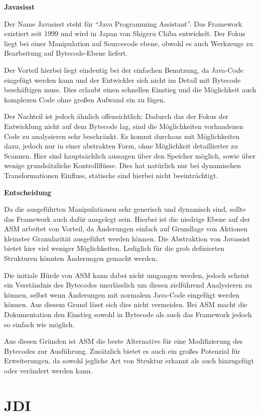\textbf{Javasisst}

Der Name Javasisst steht für "`Java Programming Assistant"'. Das Framework existiert seit 1999 und wird in Japan von Shigeru Chiba entwickelt. Der Fokus liegt bei einer Manipulation auf Sourcecode ebene, obwohl es auch Werkzeuge zu Bearbeitung auf Bytecode-Ebene liefert.

Der Vorteil hierbei liegt eindeutig bei der einfachen Benutzung, da Java-Code eingefügt werden kann und der Entwickler sich nicht im Detail mit Bytecode beschäftigen muss. Dies erlaubt einen schnellen Einstieg und die Möglichkeit auch komplexen Code ohne großen Aufwand ein zu fügen.

Der Nachteil ist jedoch ähnlich offensichtlich: Dadurch das der Fokus der Entwicklung nicht auf dem Bytecode lag, sind die Möglichkeiten vorhandenen Code zu analysieren sehr beschränkt. Es kommt durchaus mit Möglichkeiten dazu, jedoch nur in einer abstrakten Form, ohne Möglichkeit detaillierter zu Scannen. Hier sind hauptsächlich aussagen über den Speicher möglich, sowie über wenige grundsätzliche Kontrollflüsse. Dies hat natürlich nur bei dynamischen Transformationen Einfluss, statische sind hierbei nicht beeinträchtigt.

\textbf{Entscheidung}

Da die ausgeführten Manipulationen sehr generisch und dynamisch sind, sollte das Framework auch dafür ausgelegt sein. Hierbei ist die niedrige Ebene auf der ASM arbeitet von Vorteil, da Änderungen einfach auf Grundlage von Aktionen kleinster Granularität ausgeführt werden können. Die Abstraktion von Javassist bietet hier viel weniger Möglichkeiten. Lediglich für die grob definierten Strukturen könnten Änderungen gemacht werden.

Die initiale Hürde von ASM kann dabei nicht umgangen werden, jedoch scheint ein Verständnis des Bytecodes unerlässlich um diesen zielführend Analysieren zu können, selbst wenn Änderungen mit normalem Java-Code eingefügt werden können. Aus diesem Grund lässt sich dies nicht vermeiden. Bei ASM macht die Dokumentation den Einstieg sowohl in Bytecode als auch das Framework jedoch so einfach wie möglich.

Aus diesen Gründen ist ASM die beste Alternative für eine Modifizierung des Bytecodes zur Ausführung. Zusätzlich bietet es auch ein großes Potenzial für Erweiterungen, da sowohl jegliche Art von Struktur erkannt als auch hinzugefügt oder verändert werden kann.

\section{JDI} 

